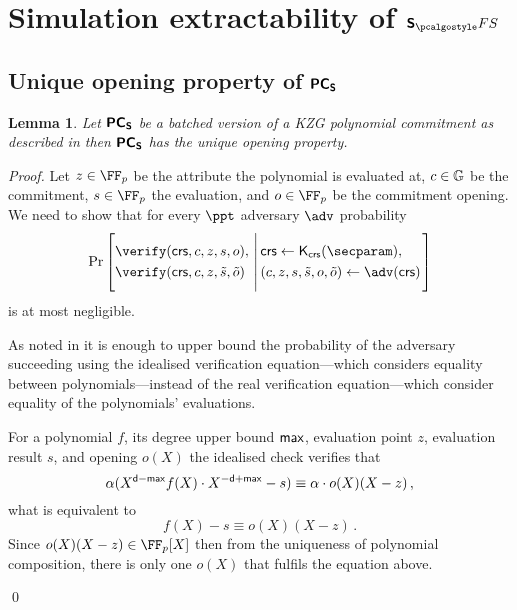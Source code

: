 \let\accentvec\vec \documentclass[runningheads,10pt]{llncs}
\newtheorem{lemma}[theorem]{Lemma}
\begin{document}
\section{Simulation extractability of $\sonicprotfs$}
\subsection{Unique opening property of $\bm{\mathsf{PC}}_{\bm{\mathsf{S}}}$}
\begin{lemma}
	\label{lem:pcoms_unique_op}
	Let $\bm{\mathsf{PC}}_{\bm{\mathsf{S}}}$ be a batched version of a KZG polynomial commitment
	\cite{AC:KatZavGol10} as described in \cite{CCS:MBKM19} then $\bm{\mathsf{PC}}_{\bm{\mathsf{S}}}$ has the unique opening property. 
\end{lemma}
\begin{proof}
	Let 
	$z \in \FF_p$ be the attribute the polynomial is evaluated at,
	$c \in \mathbb{G}$ be the commitment,  
	$s \in \FF_p$ the evaluation, and 
	$o \in \FF_p$ be the commitment opening. 
	We need to show that for every $\ppt$ adversary $\adv$ probability
	\[
		\Pr
			\left[
				\begin{aligned}
					& \verify(\crs, c, z, s, o), \\
					& \verify(\crs, c, z, \tilde{s}, \tilde{o})
				\end{aligned}
			\,\left|\,
			\vphantom{\begin{aligned}
				& \verify(\crs, c, z, s, o),\\
				& \verify(\crs, c, z, \tilde{s}, \tilde{o}) \\
				&o \neq \tilde{o})
			\end{aligned}}
			\begin{aligned}
				& \crs \gets \kcrs(\secparam), \\
				&	(c, z, s, \tilde{s}, o, \tilde{o}) \gets \adv(\crs)
			\end{aligned}
			\right.\right]
	\]
	is at most negligible.
	
	As noted in \cite[Lemma 2.2]{EPRINT:GabWilCio19} it is enough to upper bound
  the probability of the adversary succeeding using the idealised verification equation---which considers equality between polynomials---instead of the real verification equation---which consider equality of the polynomials' evaluations.
	
	For a polynomial $f$, its degree upper bound $\mathsf{max}$, evaluation point $z$, evaluation result $s$, and opening $o(X)$ the idealised check verifies that
	\begin{equation}
		\alpha (X^{\mathsf{d} - \mathsf{max}}f(X) \cdot X^{-\mathsf{d} + \mathsf{max}} -  s) \equiv \alpha \cdot o(X) (X - z)\,,
	\end{equation}
	what is equivalent to 
	\begin{equation}
		f(X) -  s \equiv o(X) (X - z)\,.
		\label{eq:pcoms_idealised_check}
	\end{equation}
	Since $o(X)(X - z) \in \FF_p[X]$ then from the uniqueness of polynomial composition, there is only one $o(X)$ that fulfils the equation above.

	\qed
\end{proof}
\end{document}
